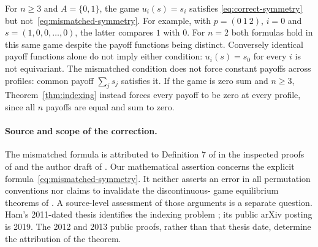 \begin{example}\label{ex:indexing}
For $n\ge3$ and $A=\{0,1\}$, the game $u_i(s)=s_i$ satisfies
\eqref{eq:correct-symmetry} but not~\eqref{eq:mismatched-symmetry}. For example,
with $p=(0\ 1\ 2)$, $i=0$ and $s=(1,0,0,\ldots,0)$, the latter compares
$1$ with $0$. For $n=2$ both formulas hold in this same game despite the
payoff functions being distinct. Conversely identical payoff functions alone
do not imply either condition: $u_i(s)=s_0$ for every $i$ is not equivariant.
The mismatched condition does not force constant payoffs across profiles:
common payoff $\sum_j s_j$ satisfies it. If the game is zero sum and $n\ge3$,
Theorem~\ref{thm:indexing} instead forces every payoff to be zero at every
profile, since all $n$ payoffs are equal and sum to zero.
\end{example}

\paragraph{Source and scope of the correction.}
The mismatched formula is attributed to Definition 7 of
\citet{dm1986} in the inspected proofs of \citet{vester2012,ham2021} and the
author draft of \citet{plan2017}. Our mathematical assertion concerns the
explicit formula~\eqref{eq:mismatched-symmetry}. It neither asserts an error
in all permutation conventions nor claims to invalidate the discontinuous-
game equilibrium theorems of \citet{dm1986}. A source-level assessment of those
arguments is a separate question. Ham's 2011-dated thesis identifies the
indexing problem \citep[Subsection~5.8]{hamthesis}; its public arXiv posting is 2019. The 2012 and 2013 public
proofs, rather than that thesis date, determine the attribution of the theorem.
